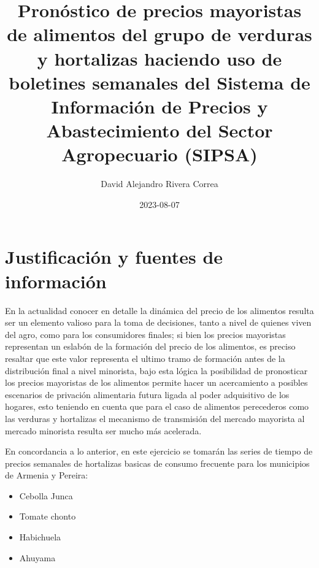 \documentclass[
]{book}
\title{Pronóstico de precios mayoristas de alimentos del grupo de verduras y hortalizas haciendo uso de boletines semanales del Sistema de Información de Precios y Abastecimiento del Sector Agropecuario (SIPSA)}
\author{David Alejandro Rivera Correa}
\date{2023-08-07}
\providecommand{\tightlist}{%
  \setlength{\itemsep}{0pt}\setlength{\parskip}{0pt}}
\begin{document}
\maketitle

{
\setcounter{tocdepth}{1}
\tableofcontents
}
\hypertarget{justificaciuxf3n-y-fuentes-de-informaciuxf3n}{%
\chapter{Justificación y fuentes de información}\label{justificaciuxf3n-y-fuentes-de-informaciuxf3n}}

En la actualidad conocer en detalle la dinámica del precio de los alimentos resulta ser un elemento valioso para la toma de decisiones, tanto a nivel de quienes viven del agro, como para los consumidores finales; si bien los precios mayoristas representan un eslabón de la formación del precio de los alimentos, es preciso resaltar que este valor representa el ultimo tramo de formación antes de la distribución final a nivel minorista, bajo esta lógica la posibilidad de pronosticar los precios mayoristas de los alimentos permite hacer un acercamiento a posibles escenarios de privación alimentaria futura ligada al poder adquisitivo de los hogares, esto teniendo en cuenta que para el caso de alimentos perecederos como las verduras y hortalizas el mecanismo de transmisión del mercado mayorista al mercado minorista resulta ser mucho más acelerada.

En concordancia a lo anterior, en este ejercicio se tomarán las series de tiempo de precios semanales de hortalizas basicas de consumo frecuente para los municipios de Armenia y Pereira:

\begin{itemize}
\tightlist
\item
  Cebolla Junca
\item
  Tomate chonto
\item
  Habichuela
\item
  Ahuyama
\end{itemize}
\end{document}
